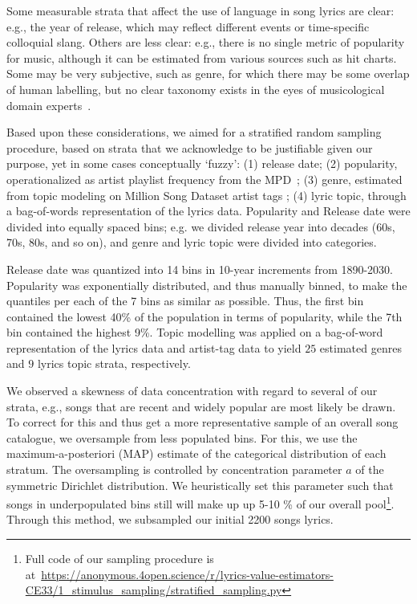 \documentclass{article}
\begin{document}
Some measurable strata that affect the use of language in song lyrics are clear: e.g., the year of release, which may reflect different events or time-specific colloquial slang. Others are less clear: e.g., there is no single metric of popularity for music, although it can be estimated from various sources such as hit charts. Some may be very subjective, such as genre, for which there may be some overlap of human labelling, but no clear taxonomy exists in the eyes of musicological domain experts~\cite{Liem2012MusicGap}. 

Based upon these considerations, we aimed for a stratified random sampling procedure, based on strata that we acknowledge to be justifiable given our purpose, yet in some cases conceptually `fuzzy': (1) release date; (2) popularity, operationalized as artist playlist frequency from the MPD~\cite{DBLP:conf/recsys/ChenLSZ18}; (3) genre,  estimated from topic modeling on Million Song Dataset artist tags  \cite{schindler2012facilitating}; (4) lyric topic, through a bag-of-words representation of the lyrics data. Popularity and Release date were divided into equally spaced bins; e.g. we divided release year into decades (60s, 70s, 80s, and so on), and genre and lyric topic were divided into categories. 

Release date was quantized into 14 bins in 10-year increments from 1890-2030. Popularity was exponentially distributed, and thus manually binned, to make the quantiles per each of the 7 bins as similar as possible. Thus, the first bin contained the lowest 40\% of the population in terms of popularity, while the 7th bin contained the highest 9\%. Topic modelling was applied on a bag-of-word representation of the lyrics data and artist-tag data to yield $25$ estimated genres and $9$ lyrics topic strata, respectively.

We observed a skewness of data concentration with regard to several of our strata, e.g., songs that are recent and widely popular are most likely be drawn. To correct for this and thus get a more representative sample of an overall song catalogue, we oversample from less populated bins. For this, we use the maximum-a-posteriori (MAP) estimate of the categorical distribution of each stratum. The oversampling is controlled by concentration parameter $a$ of the symmetric Dirichlet distribution. We heuristically set this parameter such that songs in underpopulated bins still will make up up 5-10 \% of our overall pool\footnote{Full code of our sampling procedure is at~\url{https://anonymous.4open.science/r/lyrics-value-estimators-CE33/1_stimulus_sampling/stratified_sampling.py}}. Through this method, we subsampled our initial 2200 songs lyrics.
\end{document}
